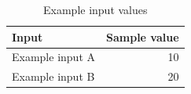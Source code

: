 \begin{table}[htbp]
  \centering
  \caption{Example input values}
  \label{tab:parameters}
  \begin{tabular}{lr}
    \toprule
    Input & Sample value \\
    \midrule
    Example input A & 10 \\
    Example input B & 20 \\
    \bottomrule
  \end{tabular}
\end{table}
